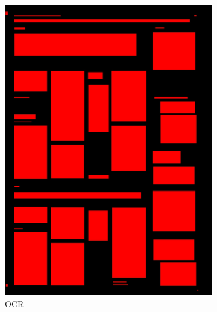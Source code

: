 \documentclass[aspectratio=1610]{beamer}
\begin{document}
\begin{frame}
  \begin{figure}
\centering
\begin{subfigure}{.25\textwidth}
  \centering
  \includegraphics[width=0.99\linewidth, clip=true, trim = 0mm 0mm 0mm 0mm]{figures/ocr/AVThDFz.jpg}
  \caption{OCR}
\end{subfigure}%
\begin{subfigure}{.25\textwidth}
  \centering

\end{subfigure}
\end{figure}
\end{frame}
\end{document}
